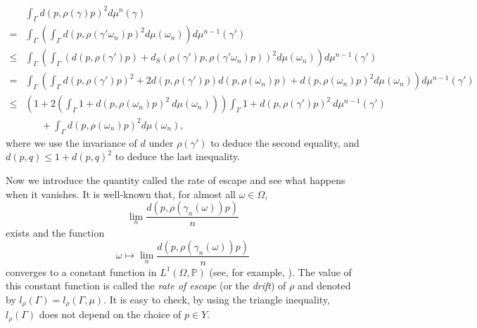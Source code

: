 \documentclass[12pt]{amsart}
\numberwithin{equation}{section}
\theoremstyle{plain}
\theoremstyle{definition}
\theoremstyle{remark}
\begin{document}
\begin{equation*}
\begin{split}
   &\int_{\Gamma} d(p,\rho(\gamma)p)^2 d\mu^n(\gamma)  \\
 = & \int_{\Gamma}\left(
   \int_{\Gamma} d(p,\rho(\gamma'\omega_n)p)^2 d\mu(\omega_n)\right)
   d\mu^{n-1}(\gamma') \\
 \leq & \int_{\Gamma}\left( \int_{\Gamma} 
    \left(d(p,\rho(\gamma')p)+
     d_S(\rho(\gamma')p,\rho(\gamma'\omega_n)p)\right)^2
 d\mu(\omega_n)\right)
   d\mu^{n-1}(\gamma') \\
  = & \int_{\Gamma}\left( \int_{\Gamma} 
     d(p,\rho(\gamma')p)^2+2d(p,\rho(\gamma')p)d(p,\rho(\omega_n)p)
      + d(p,\rho(\omega_n)p)^2
  d\mu(\omega_n)\right)
    d\mu^{n-1}(\gamma') \\
 \leq &  \left(
  1+ 2 \left(\int_{\Gamma} 1+d(p,\rho(\omega_n)p)^2\
 d\mu(\omega_n)\right)\right) 
 \int_{\Gamma}1+ d(p,\rho(\gamma')p)^2\ d\mu^{n-1}(\gamma') \\
 & \phantom{aaa} + \int_{\Gamma} d(p,\rho(\omega_n)p)^2 d\mu(\omega_n), 
\end{split}
\end{equation*}
 where we use the invariance of $d$ under $\rho(\gamma')$ to deduce the
 second equality, and 
 $d(p,q)\leq 1+d(p,q)^2$ to deduce the last inequality.

Now we introduce the quantity called the rate of escape and see
what happens when it vanishes.
It is well-known that, for almost all $\omega \in \Omega$, 
\begin{equation*}
 \lim_n \frac{d(p, \rho(\gamma_n(\omega))p)}{n}
\end{equation*}
exists and the function 
\begin{equation*}
 \omega \mapsto \lim_n \frac{d(p, \rho(\gamma_n(\omega))p)}{n}
\end{equation*}
converges to a constant function in $L^1(\Omega, \mathbb{P})$
(see, for example, \cite[\S 8, A]{woess}). 
The value of this constant function is called the {\it rate of escape}
(or the {\it drift}) of $\rho$ and denoted by 
$l_{\rho}(\Gamma)=l_{\rho}(\Gamma,\mu)$.  
It is easy to check, by using the triangle inequality,
$l_{\rho}(\Gamma)$ does not depend on the choice of $p \in Y$. 
\end{document}
